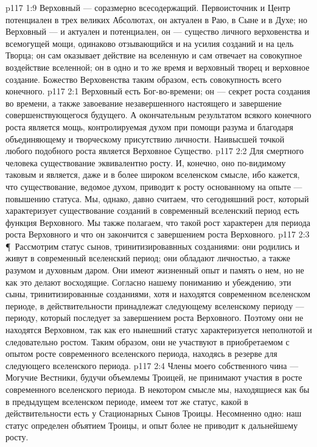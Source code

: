 \vs p117 1:9 Верховный --- соразмерно всесодержащий. Первоисточник и Центр потенциален в трех великих Абсолютах, он актуален в Раю, в Сыне и в Духе; но Верховный --- и актуален и потенциален, он --- существо личного верховенства и всемогущей мощи, одинаково отзывающийся и на усилия созданий и на цель Творца; он сам оказывает действие на вселенную и сам отвечает на совокупное воздействие вселенной; он в одно и то же время и верховный творец и верховное создание. Божество Верховенства таким образом, есть совокупность всего конечного.
\vs p117 2:1 Верховный есть Бог\hyp{}во\hyp{}времени; он --- секрет роста создания во времени, а также завоевание незавершенного настоящего и завершение совершенствующегося будущего. А окончательным результатом всякого конечного роста является мощь, контролируемая духом при помощи разума и благодаря объединяющему и творческому присутствию личности. Наивысшей точкой любого подобного роста является Верховное Существо.
\vs p117 2:2 Для смертного человека существование эквивалентно росту. И, конечно, оно по\hyp{}видимому таковым и является, даже и в более широком вселенском смысле, ибо кажется, что существование, ведомое духом, приводит к росту основанному на опыте --- повышению статуса. Мы, однако, давно считаем, что сегодняшний рост, который характеризует существование созданий в современный вселенский период есть функция Верховного. Мы также полагаем, что такой рост характерен для периода роста Верховного и что он закончится с завершением роста Верховного.
\vs p117 2:3 \P\ Рассмотрим статус сынов, тринитизировавнных созданиями: они родились и живут в современный вселенский период; они обладают личностью, а также разумом и духовным даром. Они имеют жизненный опыт и память о нем, но не  как это делают восходящие. Согласно нашему пониманию и убеждению, эти сыны, тринитизированные созданиями, хотя и находятся  современном вселенском периоде, в действительности принадлежат  следующему вселенскому периоду --- периоду, который последует за завершением роста Верховного. Поэтому они не находятся  Верховном, так как его нынешний статус характеризуется неполнотой и следовательно ростом. Таким образом, они не участвуют в приобретаемом с опытом росте современного вселенского периода, находясь в резерве для следующего вселенского периода.
\vs p117 2:4 Члены моего собственного чина --- Могучие Вестники, будучи объемлемы Троицей, не принимают участия в росте современного вселенского периода. В некотором смысле мы, находящиеся как бы в предыдущем вселенском периоде, имеем тот же статус, какой в действительности есть у Стационарных Сынов Троицы. Несомненно одно: наш статус определен объятием Троицы, и опыт более не приводит к дальнейшему росту.
